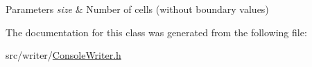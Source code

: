 \begin{DoxyParams}{Parameters}
{\em size} & Number of cells (without boundary values) \\
\hline
\end{DoxyParams}


The documentation for this class was generated from the following file\-:\begin{DoxyCompactItemize}
\item 
src/writer/\hyperlink{ConsoleWriter_8h}{Console\-Writer.\-h}\end{DoxyCompactItemize}
